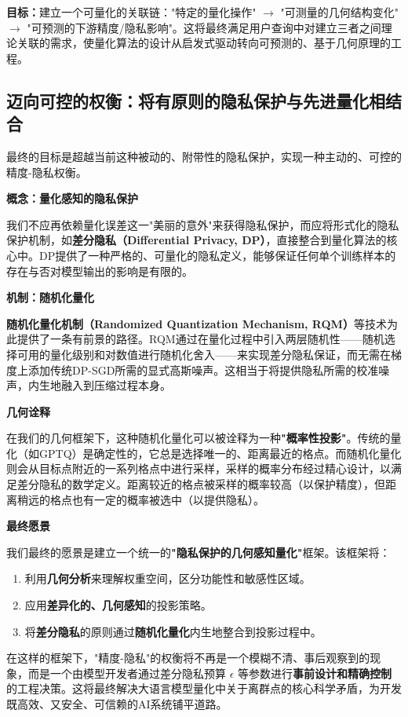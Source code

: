\documentclass[letterpaper,twocolumn,10pt]{article}
\begin{document}
\textbf{目标：}建立一个可量化的关联链："特定的量化操作" $\rightarrow$ "可测量的几何结构变化" $\rightarrow$ "可预测的下游精度/隐私影响"。这将最终满足用户查询中对建立三者之间理论关联的需求，使量化算法的设计从启发式驱动转向可预测的、基于几何原理的工程。

\subsection{迈向可控的权衡：将有原则的隐私保护与先进量化相结合}

最终的目标是超越当前这种被动的、附带性的隐私保护，实现一种主动的、可控的精度-隐私权衡。

\textbf{概念：量化感知的隐私保护}

我们不应再依赖量化误差这一"美丽的意外"来获得隐私保护，而应将形式化的隐私保护机制，如\textbf{差分隐私（Differential Privacy, DP）}，直接整合到量化算法的核心中。DP提供了一种严格的、可量化的隐私定义，能够保证任何单个训练样本的存在与否对模型输出的影响是有限的。

\textbf{机制：随机化量化}

\textbf{随机化量化机制（Randomized Quantization Mechanism, RQM）}等技术为此提供了一条有前景的路径。RQM通过在量化过程中引入两层随机性——随机选择可用的量化级别和对数值进行随机化舍入——来实现差分隐私保证，而无需在梯度上添加传统DP-SGD所需的显式高斯噪声。这相当于将提供隐私所需的校准噪声，内生地融入到压缩过程本身。

\textbf{几何诠释}

在我们的几何框架下，这种随机化量化可以被诠释为一种\textbf{"概率性投影"}。传统的量化（如GPTQ）是确定性的，它总是选择唯一的、距离最近的格点。而随机化量化则会从目标点附近的一系列格点中进行采样，采样的概率分布经过精心设计，以满足差分隐私的数学定义。距离较近的格点被采样的概率较高（以保护精度），但距离稍远的格点也有一定的概率被选中（以提供隐私）。

\textbf{最终愿景}

我们最终的愿景是建立一个统一的\textbf{"隐私保护的几何感知量化"}框架。该框架将：

\begin{enumerate}
\item 利用\textbf{几何分析}来理解权重空间，区分功能性和敏感性区域。
\item 应用\textbf{差异化的、几何感知}的投影策略。
\item 将\textbf{差分隐私}的原则通过\textbf{随机化量化}内生地整合到投影过程中。
\end{enumerate}

在这样的框架下，"精度-隐私"的权衡将不再是一个模糊不清、事后观察到的现象，而是一个由模型开发者通过差分隐私预算 $\epsilon$ 等参数进行\textbf{事前设计和精确控制}的工程决策。这将最终解决大语言模型量化中关于离群点的核心科学矛盾，为开发既高效、又安全、可信赖的AI系统铺平道路。

% 
% 
\end{document}
